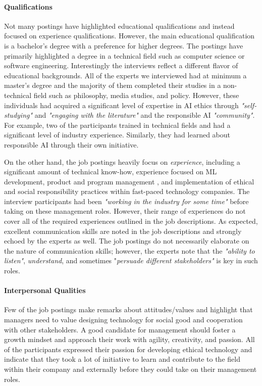 \documentclass[sigconf]{acmart}
\begin{document}
\paragraph{Qualifications} 
Not many postings have highlighted educational qualifications and instead focused on experience qualifications. However, the main educational qualification is a bachelor's degree with a preference for higher degrees. The postings have primarily highlighted a degree in a technical field such as computer science or software engineering. Interestingly the interviews reflect a different flavor of educational backgrounds. All of the experts we interviewed had at minimum a master's degree and the majority of them completed their studies in a non-technical field such as philosophy, media studies, and policy. However, these individuals had acquired a significant level of expertise in \ac{AI} ethics through \textit{"self-studying"} and \textit{"engaging with the literature"} and the responsible AI \textit{"community"}. For example, two of the participants trained in technical fields and had a significant level of industry experience. Similarly, they had learned about responsible \ac{AI} through their own initiative. 

On the other hand, the job postings heavily focus on \textit{experience}, including a significant amount of technical know-how, experience focused on ML development, product and program management , and implementation of ethical and social responsibility practices within fast-paced technology companies. The interview participants had been \textit{"working in the industry for some time"} before taking on these management roles. However, their range of experiences do not cover all of the required experiences outlined in the job descriptions. As expected, excellent communication skills are noted in the job descriptions and strongly echoed by the experts as well. The job postings do not necessarily elaborate on the nature of communication skills; however, the experts note that the \textit{"ability to listen"}, \textit{understand}, and sometimes 
"\textit{persuade different stakeholders"} is key in such roles.

\paragraph{Interpersonal Qualities}
 Few of the job postings make remarks about attitudes/values and highlight that managers need to value designing technology for social good and cooperation with other stakeholders. A good candidate for management should  foster a growth mindset and approach their work with agility, creativity, and passion. All of the participants expressed their passion for developing ethical technology  and indicate that they took a lot of initiative to learn and contribute to the field within their company and externally before they could take on their management roles. 
\end{document}
